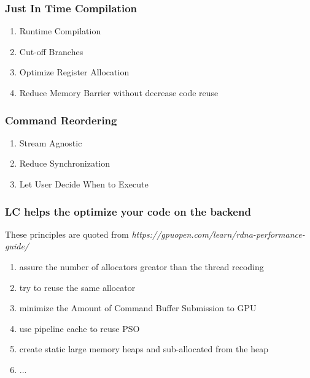\begin{frame}
    \frametitle{Just In Time Compilation}
    \begin{enumerate}
        \item Runtime Compilation
        \item Cut-off Branches
        \item Optimize Register Allocation
        \item Reduce Memory Barrier without decrease code reuse
    \end{enumerate}
\end{frame}

\begin{frame}
    \frametitle{Command Reordering}
    \begin{enumerate}
        \item Stream Agnostic
        \item Reduce Synchronization
        \item Let User Decide When to Execute
    \end{enumerate}
\end{frame}

\begin{frame}
    \frametitle{LC helps the optimize your code on the backend}
    These principles are quoted from \textit{https://gpuopen.com/learn/rdna-performance-guide/}
    \begin{enumerate}
        \item assure the number of allocators greator than the thread recoding
        \item try to reuse the same allocator
        \item minimize the Amount of Command Buffer Submission to GPU
        \item use pipeline cache to reuse PSO 
        \item create static large memory heaps and sub-allocated from the heap
        \item ...
    \end{enumerate}

\end{frame}